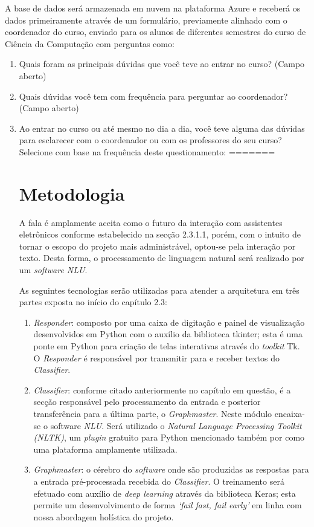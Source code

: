 \documentclass[
	12pt,				%
	oneside,
	a4paper,			%
	english,			%
	french,				%
	spanish,			%
	brazil				%
	]{abntex2}
\begin{document}
A base de dados será armazenada em nuvem na plataforma Azure e receberá os dados primeiramente através de um formulário, previamente alinhado com o coordenador do curso, enviado para os alunos de diferentes semestres do curso de Ciência da Computação com perguntas como:
\begin{enumerate}
\item Quais foram as principais dúvidas que você teve ao entrar no curso? (Campo aberto)
\item Quais dúvidas você tem com frequência para perguntar ao coordenador? (Campo aberto)

\item Ao entrar no curso ou até mesmo no dia a dia, você teve alguma das dúvidas para esclarecer com o coordenador ou com os professores do seu curso? Selecione com base na frequência deste questionamento:
=======
\section{Metodologia}

A fala é amplamente aceita como o futuro da interação com assistentes eletrônicos conforme estabelecido na secção 2.3.1.1, porém, com o intuito de tornar o escopo do projeto mais administrável, optou-se pela interação por texto. Desta forma, o processamento de linguagem natural será realizado por um \emph{software NLU}.

As seguintes tecnologias serão utilizadas para atender a arquitetura em três partes exposta no início do capítulo 2.3:

\begin{enumerate}
\item \emph{Responder}: composto por uma caixa de digitação e painel de visualização desenvolvidos em Python com o auxílio da biblioteca tkinter; esta é uma ponte em Python para criação de telas interativas através do \emph{toolkit} Tk. O \emph{Responder} é responsável por transmitir para e receber textos do \emph{Classifier}.
\item \emph{Classifier}: conforme citado anteriormente no capítulo em questão, é a secção responsável pelo processamento da entrada e posterior transferência para a última parte, o \emph{Graphmaster}. Neste módulo encaixa-se o software \emph{NLU}. Será utilizado o \emph{Natural Language Processing Toolkit (NLTK)}, um \emph{plugin} gratuito para Python mencionado também por \textcite{Abdul-Kader2015} como uma plataforma amplamente utilizada.
\item \emph{Graphmaster}: o cérebro do \emph{software} onde são produzidas as respostas para a entrada pré-processada recebida do \emph{Classifier}. O treinamento será efetuado com auxílio de \emph{deep learning} através da biblioteca Keras; esta permite um desenvolvimento de forma \emph{‘fail fast, fail early’} em linha com nossa abordagem holística do projeto.
\end{enumerate}


\end{enumerate}
\end{document}
